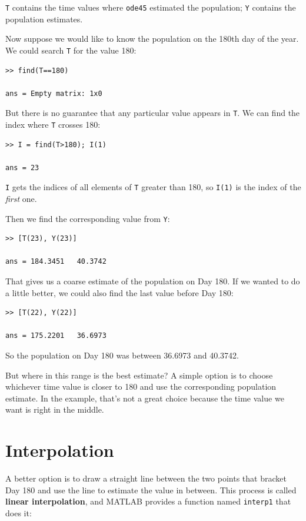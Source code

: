 \documentclass[
]{book}
\begin{document}
{\tt T} contains the time values where {\tt ode45} estimated the
population; {\tt Y} contains the population estimates.

Now suppose we would like to know the population on the 180th day
of the year.  We could search {\tt T} for the value 180:

\begin{verbatim}
>> find(T==180)

ans = Empty matrix: 1x0
\end{verbatim}

But there is no guarantee that any particular value appears in
{\tt T}.  We can find the index where {\tt T} crosses 180:

\begin{verbatim}
>> I = find(T>180); I(1)

ans = 23
\end{verbatim}

{\tt I} gets the indices of all elements of {\tt T} greater
than 180, so {\tt I(1)} is the index of the {\em first} one.

Then we find the corresponding value from {\tt Y}:

\begin{verbatim}
>> [T(23), Y(23)]

ans = 184.3451   40.3742
\end{verbatim}

That gives us a coarse estimate of the population on Day 180.
If we wanted to do a little better, we could also find the last value
before Day 180:

\begin{verbatim}
>> [T(22), Y(22)]

ans = 175.2201   36.6973
\end{verbatim}

So the population on Day 180 was between 36.6973 and 40.3742.

But where in this range is the best estimate?  A simple option is to
choose whichever time value is closer to 180 and use the corresponding
population estimate.  In the example, that's not a great choice
because the time value we want is right in the middle.


\section{Interpolation}

A better option is to draw a straight line between the two points that
bracket Day 180 and use the line to estimate the value in between.
This process is called {\bf linear interpolation}, and MATLAB provides
a function named {\tt interp1} that does it:
\end{document}

